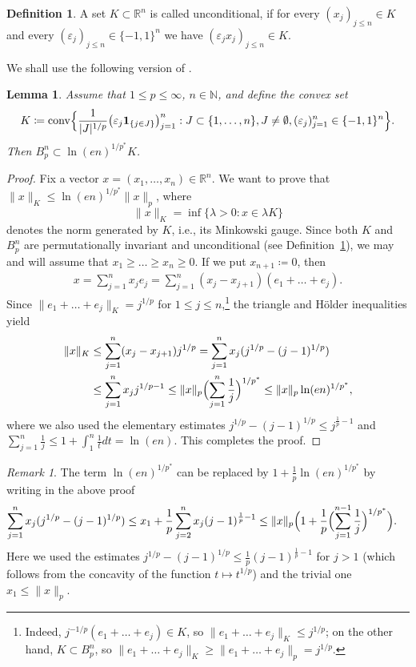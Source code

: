 \documentclass[a4paper]{amsart}
\newtheorem{lemma}[theorem]{Lemma}
\theoremstyle{definition}
\newtheorem{definition}[theorem]{Definition}
\theoremstyle{remark}
\newtheorem{remark}[theorem]{Remark}
\numberwithin{equation}{section}
\newcommand*{\RR}{\mathbb{R}}
\newcommand*{\NN}{\mathbb{N}}
\newcommand*{\conv}{\operatorname{conv}} %
\newcommand*{\ind}{\mathbf{1}} %
\begin{document}
\begin{definition}	\label{def:uncond}
	A set $K\subset \RR^n$  is called unconditional, if for every $(x_j)_{j\leq n}\in K$ and every $(\varepsilon_j)_{j\le n} \in \{-1,1\}^n$ we have $(\varepsilon_ j x_j)_{j\leq n} \in K$.
\end{definition}


We shall use the following version of \cite[Lemma~2.1]{Riemer-Schuett}.

\begin{lemma}
	\label{lem:set-K}
	Assume that $1\leq p\leq \infty$, $n\in \NN$,
	and define the convex set
	\[
	K\coloneqq \conv \Bigl\{ \frac{1}{|J|^{1/p}}\bigl( \varepsilon_j \ind_{\{j\in J\}} \bigr)_{j=1}^n : J\subset\{1,\dots,n\}, J\neq \emptyset, (\varepsilon_j )_{j=1}^n\in \{-1,1\}^n\Bigr\}.
	\]
	Then $B_p^n \subset \ln(en)^{1/p^*} K$.
\end{lemma}

\begin{proof}
	Fix a vector $x=(x_1,\dots,x_n)\in\RR^n$.
	We want to prove that $\|x\|_K \leq \ln(en)^{1/p^*} \|x\|_p$,
	where 
	\[
	\|x\|_K = \inf\{\lambda>0 \colon  x\in \lambda K\}
	\] 
	denotes the norm generated by $K$, i.e., its Minkowski gauge.	
	Since both $K$ and $B_p^n$ are permutationally invariant and unconditional (see Definition~\ref{def:uncond}), we may and will assume that $x_1\geq \dots\geq x_n\geq 0$.
	If we put $x_{n+1}\coloneqq 0$, then
	\begin{align*}
		x = \sum_{j=1}^n x_j e_j = \sum_{j=1}^n (x_j-x_{j+1}) (e_1+\dots + e_j).
	\end{align*}
	Since $\| e_1+\dots+e_j\|_K = j^{1/p}$ for $1\leq j \leq n$,\footnote{Indeed, $j^{-1/p}(e_1+\dots+e_j)\in K$, so $\| e_1+\dots+e_j\|_K \leq j^{1/p}$; on the other hand, $K\subset B_p^n$, so $\| e_1+\dots+e_j\|_K \geq \| e_1+\dots+e_j\|_p = j^{1/p}$.}
	the triangle and H\"older inequalities yield
	\begin{align*}
		\|x\|_K &\leq  \sum_{j=1}^n (x_j-x_{j+1}) j^{1/p} = \sum_{j=1}^n x_j (j^{1/p}-(j-1)^{1/p}) \\
		&\leq  \sum_{j=1}^n x_j j^{1/p - 1}
		\leq \|x\|_p \Bigl(\sum_{j=1}^n \frac{1}{j}\Bigr)^{1/p^*} \leq  \|x\|_p \ln(en)^{1/p^*},
	\end{align*}
	where we also used the elementary estimates $j^{1/p}-(j-1)^{1/p}\leq j^{\frac1p-1}$
	and $\sum_{j=1}^n \frac{1}{j}\leq 1+\int_1^n \frac{1}{t} dt = \ln(en)$.
	This completes the proof.
\end{proof}

\begin{remark}
	The term $\ln(en)^{1/p^*}$ can be replaced by $1+\frac 1p \ln(en)^{1/p^*}$  by writing in the above proof
	\begin{align*}
		\sum_{j=1}^n x_j (j^{1/p}-(j-1)^{1/p})
		&\leq  x_1+\frac{1}{p}\sum_{j=2}^n x_j (j-1)^{\frac1p - 1} \leq
		\|x\|_p \Bigl(1+\frac 1p \Bigl(\sum_{j=1}^{n-1} \frac{1}{j}\Bigr)^{1/p^*} \Bigr).
	\end{align*}
	Here we used the estimates $j^{1/p}-(j-1)^{1/p}\leq\frac{1}{p} (j-1)^{\frac1p-1}$ for $j>1$
	(which follows from the concavity of the function $t\mapsto t^{1/p}$) and the trivial one $x_1\leq\|x\|_p$.	
\end{remark}
\end{document}
